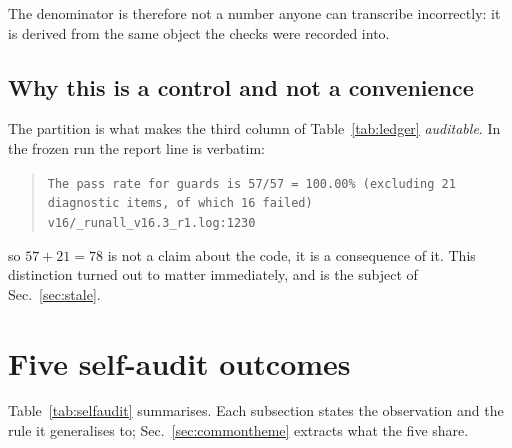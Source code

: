 \documentclass[11pt,a4paper]{article}
\newcommand{\code}[1]{\texttt{\small #1}}
\newcommand{\src}[1]{{\footnotesize\texttt{#1}}}
\begin{document}
The denominator is therefore not a number anyone can transcribe incorrectly: it
is derived from the same object the checks were recorded into.

\subsection{Why this is a control and not a convenience}

The partition is what makes the third column of Table~\ref{tab:ledger}
\emph{auditable}. In the frozen run the report line is verbatim:

\begin{quote}\small
\code{The pass rate for guards is 57/57 = 100.00\% (excluding 21 diagnostic items, of which 16 failed)}
\hfill\src{v16/\_runall\_v16.3\_r1.log:1230}
\end{quote}

so $57 + 21 = 78$ is not a claim about the code, it is a consequence of it. This
distinction turned out to matter immediately, and is the subject of
Sec.~\ref{sec:stale}.

\section{Five self-audit outcomes}
\label{sec:selfaudit}

Table~\ref{tab:selfaudit} summarises. Each subsection states the observation and
the rule it generalises to; Sec.~\ref{sec:commontheme} extracts what the five
share.
\end{document}

